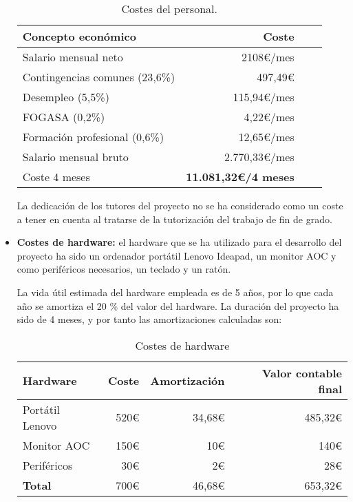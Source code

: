 \begin{itemize}
    \begin{table}[h]
    \centering
    \begin{tabular}{p{8cm}rrr}
        \hline
        \textbf{Concepto económico} & \textbf{Coste} \\
        \hline
        Salario mensual neto & 2108€/mes  \\
        Contingencias comunes (23,6\%) & 497,49€ \\
        Desempleo (5,5\%)  & {115,94€/mes}\\
        FOGASA (0,2\%) & {4,22€/mes}\\
        Formación profesional (0,6\%) & {12,65€/mes}\\\hline
        Salario mensual bruto  & {2.770,33€/mes}\\
        \hline
        Coste 4 meses  & {\textbf{11.081,32€/4 meses}}\\
        \hline
    \end{tabular}
    \caption{Costes del personal.}
    \label{tab:costes-software}
\end{table}
\newpage
La dedicación de los tutores del proyecto no se ha considerado como un coste a tener en cuenta al tratarse de la tutorización del trabajo de fin de grado.

\item \textbf{Costes de hardware:} el hardware que se ha utilizado para el desarrollo del proyecto ha sido un ordenador portátil Lenovo Ideapad, un monitor AOC y como periféricos necesarios, un teclado y un ratón.

La vida útil estimada del hardware empleada es de 5 años, por lo que cada año se amortiza el 20 \% del valor del hardware. La duración del proyecto ha sido de 4 meses, y por tanto las amortizaciones calculadas son:

\begin{table}[h]
    \centering
    \begin{tabular}{p{4cm}rrr}
        \hline
        \textbf{Hardware} & \textbf{Coste} & \textbf{Amortización} & \textbf{Valor contable final} \\
        \hline
        Portátil Lenovo & 520€ & 34,68€ & 485,32€ \\
        Monitor AOC & 150€ & 10€ & 140€ \\
        Periféricos & 30€ & 2€ & 28€ \\
        \hline
        \textbf{Total} & 700€ & 46,68€ & 653,32€ \\
        \hline
    \end{tabular}
    \caption{Costes de hardware}
    \label{tab:costes-hardware}
\end{table}


\end{itemize}
